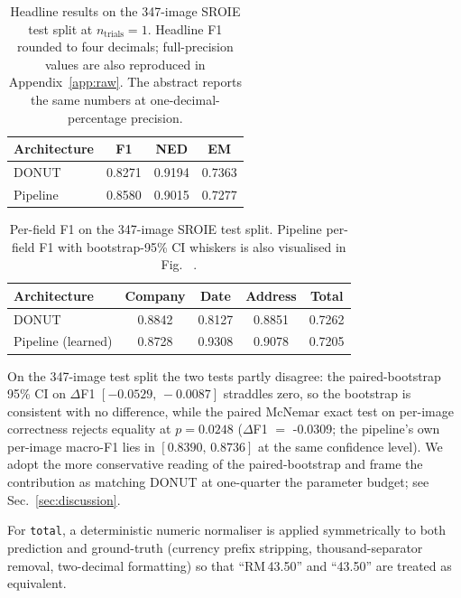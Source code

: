 \documentclass[conference]{IEEEtran}
\makeatletter
\newcommand{\figref}[1]{%
  \@ifundefined{r@#1}{\textit{[figure absent]}}{\ref{#1}}%
}
\makeatother
\begin{document}
\begin{table}[!t]
\centering
\caption{Headline results on the 347-image SROIE test split at
         $n_{\text{trials}}=1$.  Headline F1 rounded to
         four decimals; full-precision values are also reproduced in
         Appendix~\ref{app:raw}.  The abstract reports the same
         numbers at one-decimal-percentage precision.}
\label{tab:headline}
\begin{tabular}{lccc}
\toprule
Architecture & F1 & NED & EM \\ \midrule
DONUT                  & 0.8271         & 0.9194         & 0.7363 \\
Pipeline               & 0.8580      & 0.9015      & 0.7277 \\

\bottomrule
\end{tabular}
\end{table}

\begin{table}[!t]
\centering
\caption{Per-field F1 on the 347-image SROIE test split.  Pipeline
         per-field F1 with bootstrap-95\% CI whiskers is also visualised in
         Fig.~\figref{fig:f1_grouped}.}
\label{tab:perfield}
\begin{tabular}{lcccc}
\toprule
Architecture & Company & Date & Address & Total \\ \midrule
DONUT                 & 0.8842     & 0.8127     & 0.8851     & 0.7262 \\
Pipeline (learned)    & 0.8728  & 0.9308  & 0.9078  & 0.7205 \\

\bottomrule
\end{tabular}
\end{table}

On the 347-image test split the two tests partly
disagree: the paired-bootstrap 95\% CI on $\Delta$F1
$[-0.0529,\,-0.0087]$ straddles zero, so
the bootstrap is consistent with no difference, while the paired
McNemar exact test on per-image correctness rejects equality at
$p = 0.0248$ ($\Delta$F1 $=$ -0.0309; the pipeline's
own per-image macro-F1 lies in
$[0.8390,\,0.8736]$
at the same confidence level).  We adopt the more conservative
reading of the paired-bootstrap and frame the contribution as
matching DONUT at one-quarter the parameter budget;
see Sec.~\ref{sec:discussion}.

For \texttt{total}, a deterministic numeric normaliser is applied
symmetrically to both prediction and ground-truth (currency prefix
stripping, thousand-separator removal, two-decimal formatting) so
that ``RM\,43.50'' and ``43.50'' are treated as equivalent.
\end{document}
